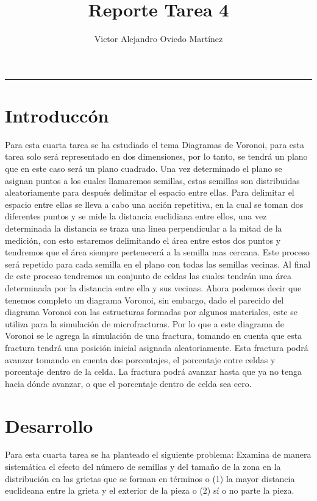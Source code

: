 \documentclass{article}
\title{Reporte Tarea 4}
\author{Victor Alejandro Oviedo Martínez}
\begin{document}
\maketitle
\hrule

\section{Introduccón}\label{intro}
Para esta cuarta tarea\citep{DRA.P4} se ha estudiado el tema Diagramas de Voronoi, para esta tarea solo será representado en dos dimensiones, por lo tanto, se tendrá un plano que en este caso será un plano cuadrado. Una vez determinado el plano se asignan puntos a los cuales llamaremos semillas, estas semillas son distribuidas aleatoriamente para después delimitar el espacio entre ellas. Para delimitar el espacio entre ellas se lleva a cabo una acción repetitiva, en la cual se toman dos diferentes puntos y se mide la distancia euclidiana entre ellos, una vez determinada la distancia se traza una linea perpendicular a la mitad de la medición, con esto estaremos delimitando el área entre estos dos puntos y tendremos que el área siempre pertenecerá a la semilla mas cercana. Este proceso será repetido para cada semilla en el plano con todas las semillas vecinas. Al final de este proceso tendremos un conjunto de celdas las cuales tendrán una área determinada por la distancia entre ella y sus vecinas. Ahora podemos decir que tenemos completo un diagrama Voronoi, sin embargo, dado el parecido del diagrama Voronoi con las estructuras formadas por algunos materiales, este se utiliza para la simulación de microfracturas. Por lo que a este diagrama de Voronoi se le agrega la simulación de  una fractura, tomando en cuenta que esta fractura tendrá una posición inicial asignada aleatoriamente. Esta fractura podrá avanzar tomando en cuenta dos porcentajes, el porcentaje entre celdas y porcentaje dentro de la celda. La fractura podrá avanzar hasta que ya no tenga hacia dónde avanzar, o que el porcentaje dentro de celda sea cero.\\


 

\section{Desarrollo}

Para esta cuarta tarea se ha planteado el siguiente problema: Examina de manera sistemática el efecto del número de semillas y del tamaño de la zona en la distribución en las grietas que se forman en términos o (1) la mayor distancia euclideana entre la grieta y el exterior de la pieza o (2) sí o no parte la pieza.\\
\end{document}

